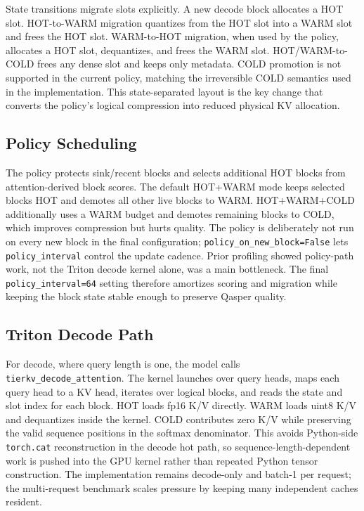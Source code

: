 \documentclass{article}
\begin{document}
State transitions migrate slots explicitly. A new decode block allocates a HOT slot. HOT-to-WARM migration quantizes from the HOT slot into a WARM slot and frees the HOT slot. WARM-to-HOT migration, when used by the policy, allocates a HOT slot, dequantizes, and frees the WARM slot. HOT/WARM-to-COLD frees any dense slot and keeps only metadata. COLD promotion is not supported in the current policy, matching the irreversible COLD semantics used in the implementation. This state-separated layout is the key change that converts the policy's logical compression into reduced physical KV allocation.

\subsection{Policy Scheduling}

The policy protects sink/recent blocks and selects additional HOT blocks from attention-derived block scores. The default HOT+WARM mode keeps selected blocks HOT and demotes all other live blocks to WARM. HOT+WARM+COLD additionally uses a WARM budget and demotes remaining blocks to COLD, which improves compression but hurts quality. The policy is deliberately not run on every new block in the final configuration; \texttt{policy\_on\_new\_block=False} lets \texttt{policy\_interval} control the update cadence. Prior profiling showed policy-path work, not the Triton decode kernel alone, was a main bottleneck. The final \texttt{policy\_interval=64} setting therefore amortizes scoring and migration while keeping the block state stable enough to preserve Qasper quality.

\subsection{Triton Decode Path}

For decode, where query length is one, the model calls \texttt{tierkv\_decode\_attention}. The kernel launches over query heads, maps each query head to a KV head, iterates over logical blocks, and reads the state and slot index for each block. HOT loads fp16 K/V directly. WARM loads uint8 K/V and dequantizes inside the kernel. COLD contributes zero K/V while preserving the valid sequence positions in the softmax denominator. This avoids Python-side \texttt{torch.cat} reconstruction in the decode hot path, so sequence-length-dependent work is pushed into the GPU kernel rather than repeated Python tensor construction. The implementation remains decode-only and batch-1 per request; the multi-request benchmark scales pressure by keeping many independent caches resident.
\end{document}
